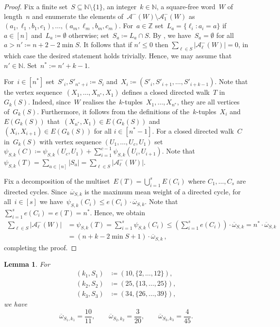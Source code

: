 \documentclass[12pt]{article}
\theoremstyle{plain}
\newtheorem{lemma}[theorem]{Lemma}
\theoremstyle{definition}
\newcommand\N{\mathbb{N}}
\newcommand{\coleq}{\coloneq}
\newcommand{\Z}{\mathbb Z}
\newcommand{\cA}{\mathcal A}
\newcommand{\g}{\psi_{S,k}}
\newcommand{\bwp}[2]{\overline\omega_{#1,#2}}
\newcommand{\bwsk}{\overline\omega_{S,k}}
\newcommand{\subs}{\subseteq}
\newcommand{\sm}{\setminus}
\newcommand{\abs}[1]{\mathopen{}\left\lvert#1\right\rvert\mathclose{}}
\begin{document}
	\begin{proof}
		Fix a finite set~$S\subs\N\sm\{1\}$, an integer~$k\in\N$, a square-free word~$W$ of length~$n$ and enumerate the elements of~$\cA^{-}(W)\sm\cA^{-}_1(W)$ as~$(a_1,\ell_1,b_1,c_1),\dots,(a_m,\ell_m,b_m,c_m)$. For~$a\in\Z$ set~$L_a = \{\ell_i:a_i=a\}$ if~$a\in[n]$ and~$L_a\coleq\emptyset$ otherwise; set~$S_a\coleq L_a\cap S$. By , we have~$S_a=\emptyset$ for all~$a>n'\coleq n+2-2\min S$. It follows that if $n'\le0$ then $\sum_{\ell\in S}\abs{\cA^-_\ell(W)}=0$, in which case the desired statement holds trivially. Hence, we may assume that $n'\in\N$. Set~$n^*:=n'+k-1$.
		
		For~$i\in[n^*]$ set~$S'_i,S'_{n^*+i}\coleq S_i$ and~$X_i\coleq(S'_i,S'_{i+1},\dots,S'_{i+k-1})$. Note that the vertex sequence~$(X_1,\dots,X_{n^*},X_1)$ defines a closed directed walk~$T$ in~$G_k(S)$. Indeed, since~$W$ realises the~$k$-tuples~$X_1,\dots,X_{n^*}$, they are all vertices of~$G_k(S)$. Furthermore, it follows from the definitions of the~$k$-tuples~$X_i$ and~$E(G_k(S))$ that~$(X_{n^*},X_1)\in E(G_k(S))$ and $(X_i,X_{i+1})\in E(G_k(S))$ for all $i\in[n^*-1]$. For a closed directed walk~$C$ in~$G_k(S)$ with vertex sequence $(U_1,\dots,U_c,U_1)$ set~$\g(C) \coleq \g(U_c,U_1) + \sum_{i=1}^{c-1} \g(U_i,U_{i+1})$. Note that~$\g(T)=\sum_{a\in[n]}\abs{S_a}=\sum_{\ell\in S}\abs{\cA^{-}_{\ell}(W)}$.
		
		Fix a decomposition of the multiset~$E(T)=\bigcup_{i=1}^sE(C_i)$ where $C_1,\dots,C_s$ are directed cycles. Since~$\bwsk$ is the maximum mean weight of a directed cycle, for all~$i\in[s]$ we have~$\g(C_i)\le e(C_i)\cdot\bwsk$. Note that~$\sum_{i=1}^se(C_i)=e(T)=n^*$. Hence, we obtain
		\begin{align*}
			\sum_{\ell\in S}\abs{\cA^{-}_{\ell}(W)} &= \g(T) = \sum_{i=1}^s\g(C_i) \le \left(\sum_{i=1}^se(C_i)\right)\cdot\bwsk = n^*\cdot\bwsk \\
			&= (n+k-2\min S+1)\cdot\bwsk\,,
		\end{align*}
		completing the proof.
	\end{proof}
	
	\begin{lemma} \label{lem:max-mean-weight-cycles}
		For
		\begin{align*}
			(k_1,S_1)&\coleq(10,\{2,\dots,12\}),\\
			(k_2,S_2)&\coleq(25,\{13,\dots,25\}),\\
			(k_3,S_3)&\coleq(34,\{26,\dots,39\}),
		\end{align*}
		we have
		\[
		\bwp{S_1}{k_1}=\frac{10}{11},\qquad
		\bwp{S_2}{k_2}=\frac{3}{20},\qquad
		\bwp{S_3}{k_3}=\frac{4}{45}.
		\]
	\end{lemma}
	
\end{document}
